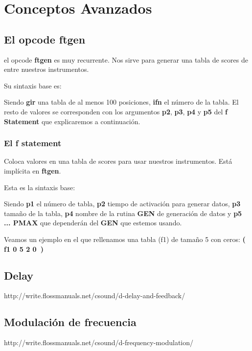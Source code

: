 
\chapter{Conceptos Avanzados}

\section{El opcode ftgen}

el opcode \textbf{ftgen} es muy recurrente. Nos sirve para generar una tabla de scores de entre nuestros instrumentos.

Su sintaxis base es:


Siendo \textbf{gir} una tabla de al menos 100 posiciones, \textbf{ifn} el número de la tabla. El resto de valores se corresponden con los argumentos \textbf{p2}, \textbf{p3}, \textbf{p4} y \textbf{p5} del \textbf{f Statement} que explicaremos a continuación.

\subsection{El f statement}

Coloca valores en una tabla de scores para usar nuestros instrumentos. Está implícita en \textbf{ftgen}.

Esta es la sintaxis base:


Siendo \textbf{p1} el número de tabla, \textbf{p2} tiempo de activación para generar datos, \textbf{p3} tamaño de la tabla, \textbf{p4} nombre de la rutina \textbf{GEN} de generación de datos y \textbf{p5 ... PMAX} que dependerán del \textbf{GEN} que estemos usando.

Veamos un ejemplo en el que rellenamos una tabla (f1) de tamaño 5 con ceros: \textbf{( f1 0 5 2 0\ )}

\section{Delay}
http://write.flossmanuals.net/csound/d-delay-and-feedback/


\section{Modulación de frecuencia}
http://write.flossmanuals.net/csound/d-frequency-modulation/
